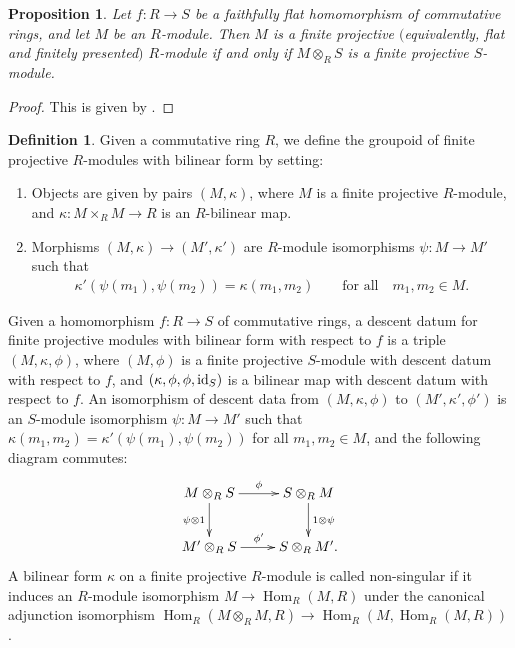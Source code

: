 \documentclass[pdftex]{sigma}
\DeclareMathOperator{\Hom}{Hom}
\newtheorem{prop}[thm]{Proposition}
\theoremstyle{definition}
\newtheorem{defn}[thm]{Definition}
\begin{document}
\begin{prop} \label{prop:finite-projective-property-descends} Let $f\colon R \to S$ be a faithfully flat homomorphism of commutative rings, and let $M$ be an $R$-module. Then $M$ is a finite projective $($equivalently, flat and finitely presented$)$ $R$-module if and only if $M \otimes_{R} S$ is a finite projective $S$-module.
\end{prop}
\begin{proof}This is given by \cite[Proposition 2.5.2]{EGA4v2}.
\end{proof}

\begin{defn}Given a commutative ring $R$, we define the groupoid of finite projective $R$-modules with bilinear form by setting:
\begin{enumerate}\itemsep=0pt
\item Objects are given by pairs $(M, \kappa)$, where $M$ is a finite projective $R$-module, and $\kappa\colon M \times_R M \to R$ is an $R$-bilinear map.
\item Morphisms $(M, \kappa) \to (M', \kappa')$ are $R$-module isomorphisms $\psi\colon M \to M'$ such that
\begin{gather*} \kappa'(\psi(m_1), \psi(m_2)) = \kappa(m_1,m_2) \qquad \text{for all} \quad m_1,m_2 \in M.\end{gather*}
\end{enumerate}
Given a homomorphism $f\colon R \to S$ of commutative rings, a descent datum for finite projective modules with bilinear form with respect to $f$ is a triple $(M, \kappa, \phi)$, where $(M, \phi)$ is a finite projective $S$-module with descent datum with respect to $f$, and $(\kappa, \phi, \phi, {\rm id}_S)$ is a bilinear map with descent datum with respect to $f$. An isomorphism of descent data from $(M, \kappa, \phi)$ to $(M', \kappa', \phi')$ is an $S$-module isomorphism $\psi\colon M \to M'$ such that $\kappa(m_1,m_2) = \kappa'(\psi(m_1),\psi(m_2))$ for all $m_1,m_2 \in M$, and the following diagram commutes:
\begin{gather*} \xymatrix{ M \otimes_{R} S \ar[r]^{\phi} \ar[d]_{\psi \otimes 1} & S \otimes_{R} M \ar[d]^{1 \otimes \psi} \\
M' \otimes_{R} S \ar[r]^{\phi'} & S \otimes_{R} M'. } \end{gather*}
A bilinear form $\kappa$ on a finite projective $R$-module is called non-singular if it induces an $R$-module isomorphism $M \to \Hom_R(M,R)$ under the canonical adjunction isomorphism $\Hom_R(M \otimes_{R} M, R) \to \Hom_R(M, \Hom_R(M,R))$.
\end{defn}
\end{document}

